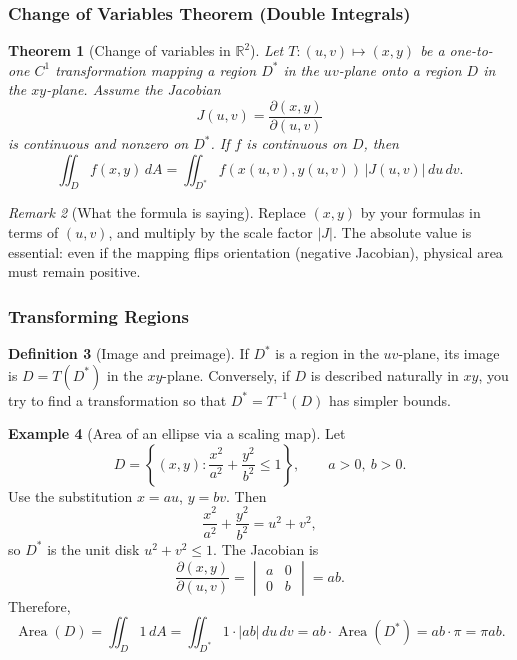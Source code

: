 \documentclass[12pt]{article}
\numberwithin{equation}{section}
\newcommand{\RR}{\mathbb{R}}
\theoremstyle{plain}
\newtheorem{theorem}{Theorem}[section]
\theoremstyle{definition}
\newtheorem{definition}[theorem]{Definition}
\newtheorem{example}[theorem]{Example}
\theoremstyle{remark}
\newtheorem{remark}[theorem]{Remark}
\begin{document}
\subsubsection{Change of Variables Theorem (Double Integrals)}

\begin{theorem}[Change of variables in $\RR^2$]\label{thm:cov2}
Let $T:(u,v)\mapsto (x,y)$ be a one-to-one $C^1$ transformation mapping a region $D^\ast$ in the $uv$-plane onto a region $D$ in the $xy$-plane. Assume the Jacobian
\[
J(u,v)=\frac{\partial(x,y)}{\partial(u,v)}
\]
is continuous and nonzero on $D^\ast$. If $f$ is continuous on $D$, then
\begin{equation}\label{eq:cov2}
\iint_D f(x,y)\,dA
=
\iint_{D^\ast} f(x(u,v),y(u,v))\,\left|J(u,v)\right|\,du\,dv.
\end{equation}
\end{theorem}

\begin{remark}[What the formula is saying]
Replace $(x,y)$ by your formulas in terms of $(u,v)$, and multiply by the scale factor $\left|J\right|$.  
The absolute value is essential: even if the mapping flips orientation (negative Jacobian), physical area must remain positive.
\end{remark}

\subsubsection{Transforming Regions}

\begin{definition}[Image and preimage]
If $D^\ast$ is a region in the $uv$-plane, its image is $D=T(D^\ast)$ in the $xy$-plane.  
Conversely, if $D$ is described naturally in $xy$, you try to find a transformation so that $D^\ast=T^{-1}(D)$ has simpler bounds.
\end{definition}

\begin{example}[Area of an ellipse via a scaling map]\label{ex:ellipse-area}
Let
\[
D=\left\{(x,y):\frac{x^2}{a^2}+\frac{y^2}{b^2}\le 1\right\},\qquad a>0,\ b>0.
\]
Use the substitution $x=au$, $y=bv$. Then
\[
\frac{x^2}{a^2}+\frac{y^2}{b^2}=u^2+v^2,
\]
so $D^\ast$ is the unit disk $u^2+v^2\le 1$. The Jacobian is
\[
\frac{\partial(x,y)}{\partial(u,v)}=
\begin{vmatrix}
a & 0\\
0 & b
\end{vmatrix}
=ab.
\]
Therefore,
\[
\operatorname{Area}(D)=\iint_D 1\,dA
=\iint_{D^\ast} 1\cdot |ab|\,du\,dv
=ab\cdot \operatorname{Area}(D^\ast)
=ab\cdot \pi
=\pi ab.
\]
\end{example}
\end{document}
